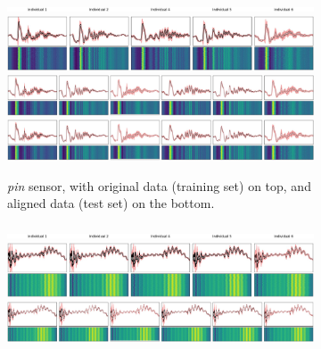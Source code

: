\begin{figure}[!htb]
    \begin{center}
    \begin{subfigure}{\linewidth}
        \includegraphics[width=\linewidth]{figures/original/plot_heatmap_class_1_1.jpg}
        \includegraphics[width=\linewidth]{figures/original/plot_heatmap_class_1_2.jpg}
        \includegraphics[height=0.161\linewidth,trim=0 0 900 0,clip]{figures/aligned/plot_heatmap_class_1_2.jpg}
        \includegraphics[height=0.161\linewidth,trim=675 0 0 0,clip]{figures/aligned/plot_heatmap_class_1_2.jpg}
        \caption{\textit{pin} sensor, with original data (training set) on top, and aligned data (test set) on the bottom.}
    \end{subfigure}
    \begin{subfigure}{\linewidth}
        \includegraphics[width=\linewidth]{figures/original/plot_heatmap_class_1_1.jpg}
        \includegraphics[width=\linewidth]{figures/original/plot_heatmap_class_1_3.jpg}
        \includegraphics[height=0.159\linewidth,trim=0 0 900 0,clip]{figures/aligned/plot_heatmap_class_1_3.jpg}

\end{subfigure}
\end{center}
\end{figure}
